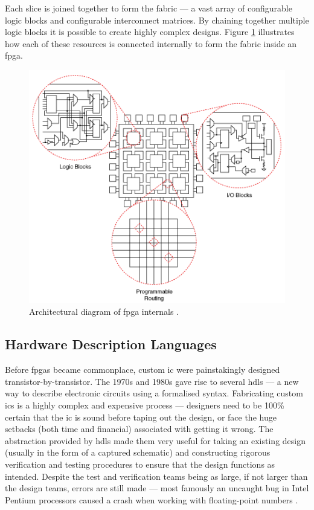 Each slice is joined together to form the fabric --- a vast array of configurable logic blocks and configurable interconnect matrices. By chaining together multiple logic blocks it is possible to create highly complex designs. Figure \ref{fig:fpga_diagram} illustrates how each of these resources is connected internally to form the fabric inside an \gls{fpga}. 

\begin{figure}
  \centering
  \includegraphics[width=1\textwidth]{./img/fpga_arch_diagram.png}
  \caption{Architectural diagram of \gls{fpga} internals \cite{ni_fpga_slice}.}
  \label{fig:fpga_diagram}
\end{figure}

\subsection{Hardware Description Languages}
Before \glspl{fpga} became commonplace, custom \gls{ic} were painstakingly designed transistor-by-transistor. The 1970s and 1980s gave rise to several \glspl{hdl} --- a new way to describe electronic circuits using a formalised syntax. Fabricating custom \glspl{ic} is a highly complex and expensive process --- designers need to be 100\% certain that the \gls{ic} is sound before taping out the design, or face the huge setbacks (both time and financial) associated with getting it wrong. The abstraction provided by \glspl{hdl} made them very useful for taking an existing design (usually in the form of a captured schematic) and constructing rigorous verification and testing procedures to ensure that the design functions as intended. Despite the test and verification teams being as large, if not larger than the design teams, errors are still made --- most famously an uncaught bug in Intel Pentium processors caused a crash when working with floating-point numbers \cite{intel_floating_point}. 

